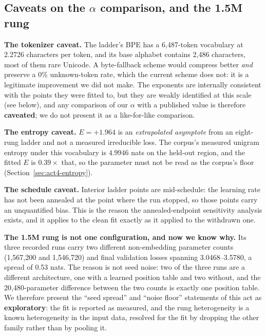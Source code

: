 \documentclass[11pt,a4paper]{article}
\begin{document}
\subsection{Caveats on the $\alpha$ comparison, and the 1.5M rung}
\label{sec:act4-1p5m}
\label{sec:act4-caveats}

\textbf{The tokenizer caveat.} The ladder's BPE has a 6,487-token vocabulary at
2.2726 characters per token, and its base alphabet contains 2,486 characters,
most of them rare Unicode. A byte-fallback scheme would compress better
\emph{and} preserve a 0\% unknown-token rate, which the current scheme does
not: it is a legitimate improvement we did not make. The exponents are
internally consistent with the points they were fitted to, but they are
weakly identified at this scale (see below), and any comparison of our
$\alpha$ with a published value is therefore \textbf{caveated}; we do not
present it as a like-for-like comparison.

\textbf{The entropy caveat.} $E = +1.964$ is an \emph{extrapolated asymptote}
from an eight-rung ladder and not a measured irreducible loss. The corpus's
measured unigram entropy under this vocabulary is $4.9946$ nats on the
held-out region, and the fitted $E$ is $0.39\times$ that, so the parameter
must not be read as the corpus's floor (Section~\ref{sec:act4-entropy}).

\textbf{The schedule caveat.} Interior ladder points are mid-schedule: the
learning rate has not been annealed at the point where the run stopped, so
those points carry an unquantified bias. This is the reason the annealed-endpoint
sensitivity analysis exists, and it applies to the clean fit exactly as it
applied to the withdrawn one.

\textbf{The 1.5M rung is not one configuration, and now we know why.} Its
three recorded runs carry two different non-embedding parameter counts
(1,567,200 and 1,546,720) and final validation losses spanning 3.0468--3.5780,
a spread of 0.53 nats. The reason is not seed noise: two of the three runs
are a different architecture, one with a learned position table and two
without, and the 20,480-parameter difference between the two counts is
exactly one position table. %
 We therefore present the ``seed spread'' and
``noise floor'' statements of this act as \textbf{exploratory}: the fit is
reported as measured, and the rung heterogeneity is a known heterogeneity in
the input data, resolved for the fit by dropping the other family rather than
by pooling it.
\end{document}
